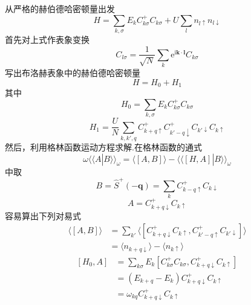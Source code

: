 从严格的赫伯德哈密顿量出发
\begin{equation*}
  H=\sum_{k,\sigma}E_{k}C_{k\sigma}^{+}C_{k\sigma}+U\sum_{l}n_{l\uparrow}n_{l\downarrow}
\end{equation*}
首先对上式作表象变换
\begin{equation*}
  C_{l\sigma}=\frac{1}{\sqrt{N}}\sum_{k}\mathrm{e}^{\mathrm{i}\boldsymbol{k}\cdot\boldsymbol{l}}C_{k\sigma}
\end{equation*}
写出布洛赫表象中的赫伯德哈密顿量
\begin{equation}
  H=H_{0}+H_{1}
\end{equation}
其中
\begin{equation}
  H_{0}=\sum_{k,\sigma}E_{k}C_{k\sigma}^{+}C_{k\sigma}
\end{equation}
\begin{equation}
  H_{1}=\frac{U}{N}\sum_{k,k',q}C_{k+q\uparrow}^{+}C_{k'-q\downarrow}^{+}C_{k'\downarrow}C_{k\uparrow}
\end{equation}
然后，利用格林函数运动方程求解.在格林函数的通式
\begin{equation}
  \omega\langle\langle A|B\rangle\rangle_{\omega}
  =\langle[A,B]\rangle-\langle\langle[H,A]|B\rangle\rangle_{\omega}
\end{equation}
中取
\begin{equation}
  B=\hat{S}^{+}(-\boldsymbol{q})=\sum_{k}C_{k-q\uparrow}^{+}C_{k\downarrow}
\end{equation}
\begin{equation}
  A=C_{k+q\downarrow}^{+}C_{k\uparrow}
\end{equation}
容易算出下列对易式
\begin{equation}
\begin{aligned}
  \langle[A,B]\rangle&=\sum_{k'}\langle[C_{k+q\downarrow}^{+}C_{k\uparrow},C_{k'-q\uparrow}^{+}C_{k'\downarrow}]\rangle\\
  &=\langle n_{k+q\downarrow}\rangle-\langle n_{k\uparrow}\rangle
\end{aligned}
\end{equation}
\begin{equation}
\begin{aligned}
  {}[H_{0},A]&=\sum_{k\sigma}E_{k}[C_{k\sigma}^{+}C_{k\sigma},C_{k+q\downarrow}^{+}C_{k\uparrow}]\\
  &=(E_{k+q}-E_{k})C_{k+q\downarrow}^{+}C_{k\uparrow}\\
  &=\omega_{kq}C_{k+q\downarrow}^{+}C_{k\uparrow}
\end{aligned}
\end{equation}
